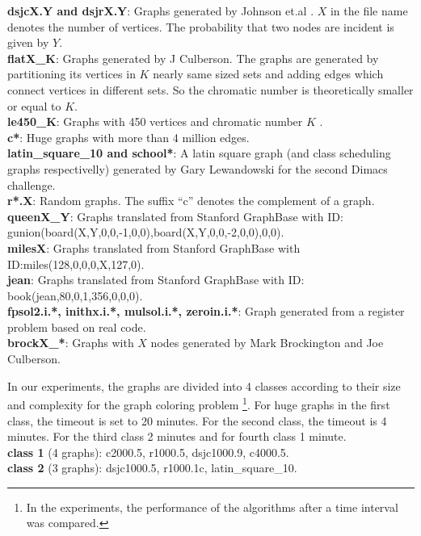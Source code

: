 \documentclass[12pt,a4paper,twoside]{scrartcl}
\numberwithin{equation}{section}
\begin{document}
 \textbf{dsjcX.Y and dsjrX.Y}: Graphs generated by Johnson et.al \cite{johnson1991optimization}. $X$ in the file name denotes the number of vertices. The probability that two nodes are incident is given by $Y.$\\
\textbf{flatX\_K}: Graphs generated by J Culberson. The graphs are generated by partitioning its vertices in $K$ nearly same sized sets and adding edges which connect vertices in different sets. So the chromatic number is theoretically smaller or equal to $K$.\\ 
 \textbf{le450\_K}: Graphs with 450 vertices and chromatic number $K$ \cite{leighton1979graph}.\\
 \textbf{c*}: Huge graphs with more than 4 million edges.\\
 \textbf{latin\_square\_10 and school*}: A latin square graph (and class scheduling graphs respectivelly) generated by Gary Lewandowski for the second Dimacs challenge.\\
 \textbf{r*.X}: Random graphs. The suffix ``c'' denotes the complement of a graph.\\
 \textbf{queenX\_Y}: Graphs translated from Stanford GraphBase with ID: gunion(board(X,Y,0,0,-1,0,0),board(X,Y,0,0,-2,0,0),0,0).\\
 \textbf{milesX}: Graphs translated from Stanford GraphBase with ID:miles(128,0,0,0,X,127,0).\\
 \textbf{jean}: Graphs translated from Stanford GraphBase with ID: book(jean,80,0,1,356,0,0,0).\\
 \textbf{fpsol2.i.*, inithx.i.*, mulsol.i.*, zeroin.i.*}: Graph generated from a register problem based on real code.\\
\textbf{brockX\_*}: Graphs with $X$ nodes generated by Mark Brockington and Joe Culberson. 
 
 
 In our experiments, the graphs are divided into 4 classes according to their size and complexity for the graph coloring problem \footnote{In the experiments, the performance of the algorithms after a time interval was compared.}. For huge graphs in the first class, the timeout is set to 20 minutes. For the second class, the timeout is 4 minutes. For the third class 2 minutes and for fourth class 1 minute.\\
 
\textbf{class 1} (4 graphs): c2000.5, r1000.5, dsjc1000.9, c4000.5.\\

\textbf{class 2} (3 graphs): dsjc1000.5, r1000.1c, latin\_square\_10.
\end{document}
